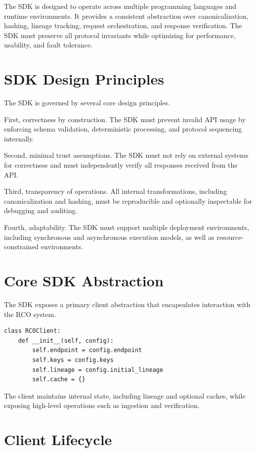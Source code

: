 The SDK is designed to operate across multiple programming languages and runtime environments. It provides a consistent abstraction over canonicalization, hashing, lineage tracking, request orchestration, and response verification. The SDK must preserve all protocol invariants while optimizing for performance, usability, and fault tolerance.

\section{SDK Design Principles}

The SDK is governed by several core design principles.

First, correctness by construction. The SDK must prevent invalid API usage by enforcing schema validation, deterministic processing, and protocol sequencing internally.

Second, minimal trust assumptions. The SDK must not rely on external systems for correctness and must independently verify all responses received from the API.

Third, transparency of operations. All internal transformations, including canonicalization and hashing, must be reproducible and optionally inspectable for debugging and auditing.

Fourth, adaptability. The SDK must support multiple deployment environments, including synchronous and asynchronous execution models, as well as resource-constrained environments.

\section{Core SDK Abstraction}

The SDK exposes a primary client abstraction that encapsulates interaction with the RCO system.

\begin{verbatim}
class RCOClient:
    def __init__(self, config):
        self.endpoint = config.endpoint
        self.keys = config.keys
        self.lineage = config.initial_lineage
        self.cache = {}
\end{verbatim}

The client maintains internal state, including lineage and optional caches, while exposing high-level operations such as ingestion and verification.

\section{Client Lifecycle}

